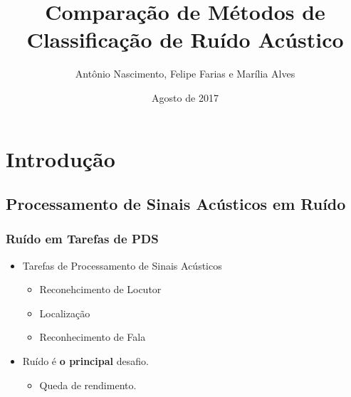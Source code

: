 \documentclass{beamer}
\title[Ciência de Dados]{Comparação de Métodos de Classificação de Ruído Acústico}
\author[Nascimento, Farias, Alves]
{
Antônio Nascimento, Felipe Farias e Marília Alves
}
\institute[IME]{%
Instituto Militar de Engenharia \\
}
\date[Agosto de 2017] %
{Agosto de 2017}
\begin{document}

\justifying

\begin{frame}
  \titlepage
\end{frame}




\section[Sumário]{}
\begin{frame}
  \tableofcontents
\end{frame}




\section{Introdução}

\subsection{Processamento de Sinais Acústicos em Ruído}

\begin{frame}
	\justifying
  	\frametitle{Ruído em Tarefas de PDS}
  	
  	\begin{itemize}
  		\setlength\itemsep{1em}
  		\item Tarefas de Processamento de Sinais Acústicos
        \begin{itemize}
        	\item Reconehcimento de Locutor
            \item Localização
            \item Reconhecimento de Fala
        \end{itemize}
        \item Ruído é \textbf{o principal} desafio.
        \begin{itemize}
        \item Queda de rendimento.
        \end{itemize}
  	\end{itemize}
\end{frame}
\end{document}

